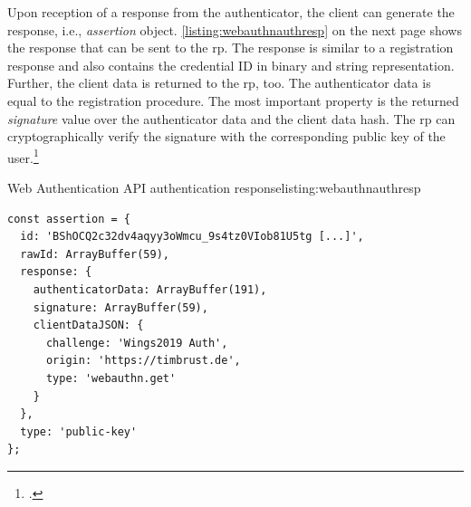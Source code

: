 Upon reception of a response from the authenticator, the client can generate the response, i.e., \textit{assertion} object. \autoref{listing:webauthnauthresp} on the next page shows the response that can be sent to the \gls{rp}. The response is similar to a registration response and also contains the credential ID in binary and string representation. Further, the client data is returned to the \gls{rp}, too. The authenticator data is equal to the registration procedure. The most important property is the returned \textit{signature} value over the authenticator data and the client data hash. The \gls{rp} can cryptographically verify the signature with the corresponding public key of the user.\footcites[See][Chapter 5.1.4.1, 5.2.2, 6.3.3]{w3c}
\\
\begin{example}{Web Authentication API authentication response}{listing:webauthnauthresp}
\begin{verbatim}
const assertion = {
  id: 'BShOCQ2c32dv4aqyy3oWmcu_9s4tz0VIob81U5tg [...]',
  rawId: ArrayBuffer(59),
  response: {
    authenticatorData: ArrayBuffer(191),
    signature: ArrayBuffer(59),
    clientDataJSON: {
      challenge: 'Wings2019 Auth',
      origin: 'https://timbrust.de',
      type: 'webauthn.get'
    }
  },
  type: 'public-key'
};
\end{verbatim}
\end{example}
